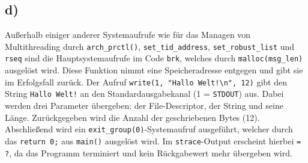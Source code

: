 \documentclass[a4paper,12pt]{article}
\begin{document}
\subsection*{d)}
Außerhalb einiger anderer Systemaufrufe wie für das Managen von Multithreading durch \texttt{arch\_prctl()}, 
\texttt{set\_tid\_address}, \texttt{set\_robust\_list} und \texttt{rseq} sind die Hauptsystemaufrufe im Code \texttt{brk}, 
welches durch \texttt{malloc(msg\_len)} ausgelöst wird. Diese Funktion nimmt eine Speicheradresse entgegen und gibt sie im Erfolgsfall zurück. 
Der Aufruf \verb|write(1, "Hallo Welt!\n", 12)| gibt den String \texttt{Hallo Welt!} an den Standardausgabekanal (1 = \texttt{STDOUT}) aus. 
Dabei werden drei Parameter übergeben: der File-Descriptor, der String und seine Länge. Zurückgegeben wird die Anzahl der geschriebenen Bytes (12).
Abschließend wird ein \texttt{exit\_group(0)}-Systemaufruf ausgeführt, welcher durch das \texttt{return 0;} aus \texttt{main()} ausgelöst wird. 
Im \texttt{strace}-Output erscheint hierbei \texttt{= ?}, da das Programm terminiert und kein Rückgabewert mehr übergeben wird.
\end{document}
